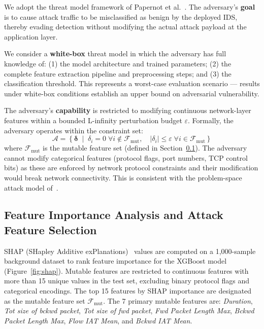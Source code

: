 \documentclass[review,12pt]{elsarticle}
\begin{document}
We adopt the threat model framework of Papernot et al.~\cite{papernot2016transferability}. The adversary's \textbf{goal} is to cause attack traffic to be misclassified as benign by the deployed IDS, thereby evading detection without modifying the actual attack payload at the application layer.

We consider a \textbf{white-box} threat model in which the adversary has full knowledge of: (1) the model architecture and trained parameters; (2) the complete feature extraction pipeline and preprocessing steps; and (3) the classification threshold. This represents a worst-case evaluation scenario --- results under white-box conditions establish an upper bound on adversarial vulnerability.

The adversary's \textbf{capability} is restricted to modifying continuous network-layer features within a bounded L-infinity perturbation budget $\varepsilon$. Formally, the adversary operates within the constraint set:
\[
  \mathcal{A} = \left\{\boldsymbol{\delta} \;\middle|\; \delta_i = 0 \; \forall i \notin \mathcal{F}_\text{mut}, \quad |\delta_i| \leq \varepsilon \; \forall i \in \mathcal{F}_\text{mut}\right\}
\]
where $\mathcal{F}_\text{mut}$ is the mutable feature set (defined in Section~\ref{sec:features}). The adversary cannot modify categorical features (protocol flags, port numbers, TCP control bits) as these are enforced by network protocol constraints and their modification would break network connectivity. This is consistent with the problem-space attack model of~\cite{apruzzese2022modeling}.

\subsection{Feature Importance Analysis and Attack Feature Selection}
\label{sec:features}

SHAP (SHapley Additive exPlanations)~\cite{lundberg2017shap} values are computed on a 1,000-sample background dataset to rank feature importance for the XGBoost model (Figure~\ref{fig:shap}). Mutable features are restricted to continuous features with more than 15 unique values in the test set, excluding binary protocol flags and categorical encodings. The top 15 features by SHAP importance are designated as the mutable feature set $\mathcal{F}_\text{mut}$. The 7 primary mutable features are: \textit{Duration}, \textit{Tot size of bckwd packet}, \textit{Tot size of fwd packet}, \textit{Fwd Packet Length Max}, \textit{Bckwd Packet Length Max}, \textit{Flow IAT Mean}, and \textit{Bckwd IAT Mean}.
\end{document}
